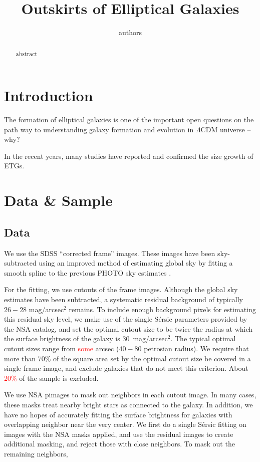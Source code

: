\documentclass{aastex}
\newcommand{\Sersic}{S\'ersic}
\newcommand\todo[1]{\textcolor{red}{#1}}
\begin{document}
\title{Outskirts of Elliptical Galaxies}
\author{authors}


\begin{abstract}
    abstract    
\end{abstract}    


\section{Introduction}
The formation of elliptical galaxies is one of the important open questions on the path way to
understanding galaxy formation and evolution in $\Lambda$CDM universe -- why?

In the recent years, many studies have reported and confirmed the size growth of ETGs.

\section{Data \& Sample}

\subsection{Data}
We use the SDSS ``corrected frame'' images. These images have been sky-subtracted using an improved
method of estimating global sky by fitting a smooth spline to the previous PHOTO sky estimates
\citep[see][for details]{blanton2011}.

For the fitting, we use cutouts of the frame images. Although the global sky estimates have been subtracted,
a systematic residual background of typically $26-28$ mag/arcsec$^2$ remains.
To include enough background pixels for estimating this residual sky level, we make use of the single \Sersic{}
parameters provided by the NSA catalog,
and set the optimal cutout size to be twice the radius at which the surface
brightness of the galaxy is 30~mag/arcsec$^2$.
The typical optimal cutout sizes range from \todo{some} arcsec ($40-80$ petrosian radius).
We require that more than 70\% of the square area set by the optimal cutout size be covered in a single frame image,
and exclude galaxies that do not meet this criterion.
About \todo{20\%} of the sample is excluded.

We use NSA pimages to mask out neighbors in each cutout image. In many cases, these masks treat nearby bright
stars as connected to the galaxy.
In addition, we have no hopes of accurately fitting the surface brightness for galaxies with overlapping neighbor
near the very center.
We first do a single \Sersic{} fitting on images with the NSA masks applied, and use the residual images to create
additional masking, and reject those with close neighbors.
To mask out the remaining neighbors, 
\end{document}
